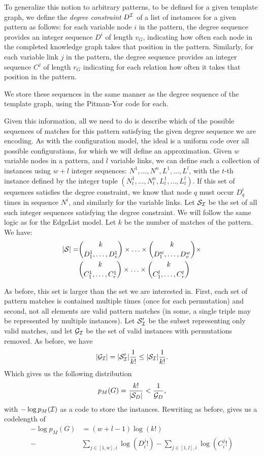 \documentclass[letterpaper]{article} %
\newcommand{\G}{{\cal G}}
\newcommand{\cS}{{\cal S}}
\newcommand{\I}{{\cal I}}
\begin{document}
 To generalize this notion to arbitrary patterns, to be defined for a given template graph, we define the \emph{degree constraint} $D^\I$ of a list of instamces for a given pattern as follows: for each variable node $i$ in the pattern, the degree sequence provides an integer sequence $D^i$ of length $v_G$, indicating how often each node in the completed knowledge graph takes that position in the pattern. Similarly, for each variable link $j$ in the pattern, the degree sequence provides an integer sequence $C^j$ of length $r_G$ indicating for each relation how often it takes that position in the pattern.
 
 We store these sequences in the same manner as the degree sequence of the template graph, using the Pitman-Yor code for each.
 
Given this information, all we need to do is describe which of the possible sequences of matches for this pattern satisfying the given degree sequence we are encoding. As with the configuration model, the ideal is a uniform code over all possible configurations, for which we will define an approximation. Given $w$ variable nodes in a pattern, and $l$ variable links, we can define such a collection of instances using $w+l$ integer sequences: $N^1, \ldots, N^n, L^1, \ldots, L^l$, with the $t$-th instance defined by the integer tuple $(N^1_t, \ldots, N^n_t, L^1_t, \ldots, L^l_t)$. If this set of sequences satisfies the degree constraint, we know that node $q$ must occur $D^i_q$ times in sequence $N^i$, and similarly for the variable links. Let $\cS_\I$ be the set of all such integer sequences satisfying the degree constraint. We will follow the same logic as for the EdgeList model. Let $k$ be the number of matches of the pattern. We have:
\begin{align*}
|\cS| = &{k \choose D^1_1, \ldots, D^1_v}\times \ldots \times{k \choose D^w_1, \ldots, D^w_v}\times \\
&{k \choose C^1_1, \ldots, C^1_r}\times \ldots \times{k \choose C^l_1, \ldots, C^l_r}
\end{align*}

As before, this set is larger than the set we are interested in. First, each set of pattern matches is contained multiple times (once for each permutation) and second, not all elements are valid pattern matches (in some, a single triple may be represented by multiple instances). Let $\cS_\I'$ be the subset representing only valid matches, and let $\G_\I$ be the set of valid instances with permutations removed. As before, we have
\[
|\G_\I| = |\cS'_\I| \frac{1}{k!} \leq  |\cS_\I| \frac{1}{k!} \text{.}
\]
Which gives us the following distribution
\[
p_M(G) =  \frac{k!}{|\cS_D|} < \frac{1}{\G_D} \text{,}
\]
 with $-\log p_M(\I)$ as a code to store the instances. Rewriting as before, gives us a codelength of 
 \begin{align*}
 - \log p_M(G) &= (w+l-1)\log(k!) \\
  -&\sum_{j\in [1,w], i} \log(D^j_i!) -\sum_{j\in [1,l], i} \log(C^j_i!)
 \end{align*}
 
\end{document}
